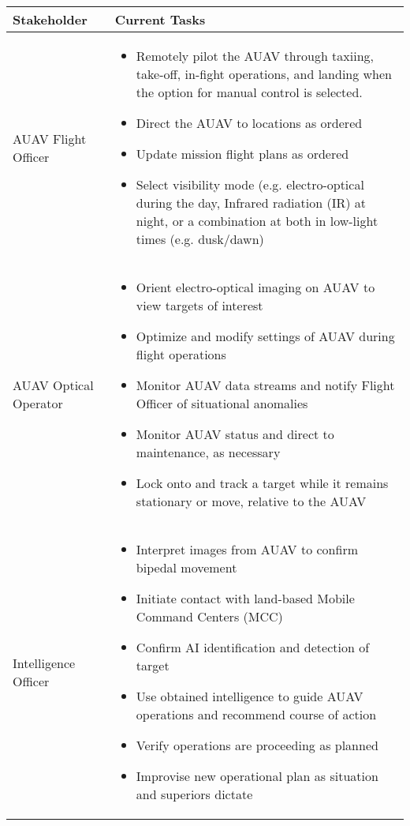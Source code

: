 \begin{fullwidth}
    \begin{longtable}{ | p{5cm} | p{12cm} | }
        \hline
        \rowcolor[gray]{.8}
        \textbf{Stakeholder} & \textbf{Current Tasks} \\
        \hline
        AUAV Flight Officer &
        \begin{itemize}
            \item Remotely pilot the AUAV through taxiing, take-off, in-fight operations, and landing when the option for manual control is selected.
            \item Direct the AUAV to locations as ordered
            \item Update mission flight plans as ordered
            \item Select visibility mode (e.g. electro-optical during the day, Infrared radiation (IR) at night, or a combination at both in low-light times (e.g. dusk/dawn)
        \end{itemize} \\
        \hline
        AUAV Optical Operator &
        \begin{itemize}
            \item Orient electro-optical imaging on AUAV to view targets of interest
            \item Optimize and modify settings of AUAV during flight operations
            \item Monitor AUAV data streams and notify Flight Officer of situational anomalies
            \item Monitor AUAV status and direct to maintenance, as necessary
            \item Lock onto and track a target  while it remains stationary or move, relative to the AUAV
        \end{itemize} \\
        \hline
        Intelligence Officer &
        \begin{itemize}
            \item Interpret images from AUAV to confirm bipedal movement
            \item Initiate contact with land-based Mobile Command Centers (MCC)
            \item Confirm AI identification and detection of target
            \item Use obtained intelligence to guide AUAV operations and recommend course of action
            \item Verify operations are proceeding as planned
            \item Improvise new operational plan as situation and superiors dictate

\end{itemize}
\end{longtable}
\end{fullwidth}
